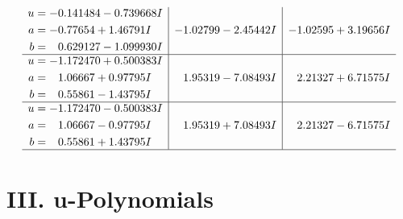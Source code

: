 \documentclass[1p]{elsarticle_modified}
\theoremstyle{definition}
\begin{document}
$$\begin{array}{c|c|c}
\begin{aligned}
u &= -0.141484 - 0.739668 I \\
a &= -0.77654 + 1.46791 I \\
b &= \phantom{-}0.629127 - 1.099930 I\end{aligned}
 & -1.02799 - 2.45442 I & -1.02595 + 3.19656 I \\ \hline\begin{aligned}
u &= -1.172470 + 0.500383 I \\
a &= \phantom{-}1.06667 + 0.97795 I \\
b &= \phantom{-}0.55861 - 1.43795 I\end{aligned}
 & \phantom{-}1.95319 - 7.08493 I & \phantom{-}2.21327 + 6.71575 I \\ \hline\begin{aligned}
u &= -1.172470 - 0.500383 I \\
a &= \phantom{-}1.06667 - 0.97795 I \\
b &= \phantom{-}0.55861 + 1.43795 I\end{aligned}
 & \phantom{-}1.95319 + 7.08493 I & \phantom{-}2.21327 - 6.71575 I\\
 \hline 
 \end{array}$$\newpage
\newpage\renewcommand{\arraystretch}{1}
\centering \section*{ III. u-Polynomials}
\end{document}
